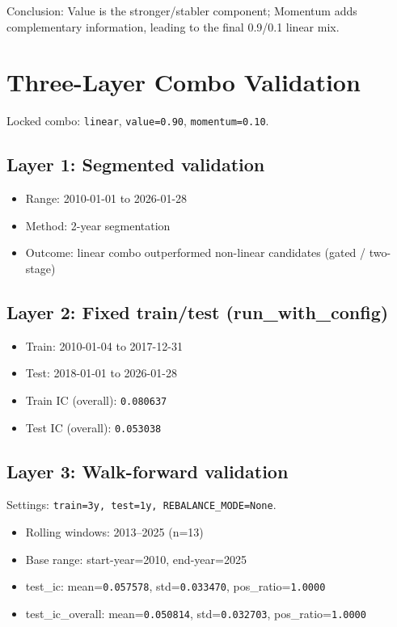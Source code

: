 \documentclass[12pt,a4paper]{article}
\begin{document}
Conclusion: Value is the stronger/stabler component; Momentum adds complementary information, leading to the final 0.9/0.1 linear mix.

\section{Three-Layer Combo Validation}
Locked combo: \texttt{linear}, \texttt{value=0.90}, \texttt{momentum=0.10}.

\subsection*{Layer 1: Segmented validation}
\begin{itemize}
  \item Range: 2010-01-01 to 2026-01-28
  \item Method: 2-year segmentation
  \item Outcome: linear combo outperformed non-linear candidates (gated / two-stage)
\end{itemize}

\subsection*{Layer 2: Fixed train/test (run\_with\_config)}
\begin{itemize}
  \item Train: 2010-01-04 to 2017-12-31
  \item Test: 2018-01-01 to 2026-01-28
  \item Train IC (overall): \texttt{0.080637}
  \item Test IC (overall): \texttt{0.053038}
\end{itemize}

\subsection*{Layer 3: Walk-forward validation}
Settings: \texttt{train=3y, test=1y, REBALANCE\_MODE=None}.
\begin{itemize}
  \item Rolling windows: 2013--2025 (n=13)
  \item Base range: start-year=2010, end-year=2025
  \item test\_ic: mean=\texttt{0.057578}, std=\texttt{0.033470}, pos\_ratio=\texttt{1.0000}
  \item test\_ic\_overall: mean=\texttt{0.050814}, std=\texttt{0.032703}, pos\_ratio=\texttt{1.0000}
\end{itemize}
\end{document}
